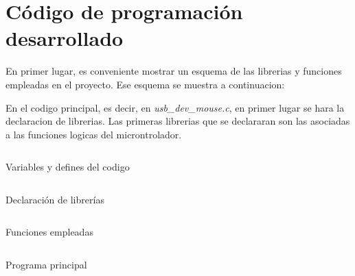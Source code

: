 \documentclass[a4paper,twoside]{article}
\begin{document}
\section{Código de programación desarrollado}
En primer lugar, es conveniente mostrar un esquema de las librerias y funciones empleadas en el proyecto. Ese esquema se muestra a continuacion:


\newpage
En el codigo principal, es decir, en \textit{usb\_dev\_mouse.c}, en primer lugar se hara la declaracion de librerias. Las primeras librerias que se declararan son las asociadas a las funciones logicas del microntrolador.

\begin{listing}[h!]
\inputminted[linenos,breaklines,frame=lines,framesep=2mm]{c}{codes/variables.c}
\caption{Variables y defines del codigo}
\end{listing}

\begin{listing}[h!]
\inputminted[linenos,breaklines,frame=lines,framesep=2mm]{c}{codes/librerias.c}
\caption{Declaración de librerías}
\end{listing}

\begin{listing}[h!]
\inputminted[linenos,breaklines,frame=lines,framesep=2mm]{c}{codes/funciones.c}
\caption{Funciones empleadas}
\end{listing}

\begin{listing}[h!]
\inputminted[linenos,breaklines,bgcolor=lightgray,frame=lines,framesep=2mm]{c}{codes/main.c}
\caption{Programa principal}
\end{listing}


\newpage
\end{document}
